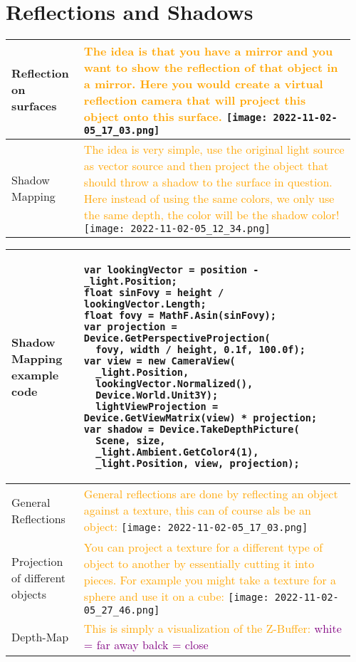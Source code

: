 \documentclass[main.tex,fontsize=8pt,paper=a4,paper=portrait,DIV=calc,]{scrartcl}
\begin{document}
\begin{table}[ht!]
\section{Reflections and Shadows}
\begin{tabular}{|m{0.2\linewidth}|m{0.755\linewidth}|}
\hline 
Reflection on surfaces & 
\textcolor{orange}{The idea is that you have a mirror and you want to show the reflection of that object in a mirror. Here you would create a virtual reflection camera that will project this object onto this surface.}\newline
\texttt{[image: 2022-11-02-05\_17\_03.png]}\\
\hline
Shadow Mapping & 
\textcolor{orange}{The idea is very simple, use the original light source as vector source and then project the object that should throw a shadow to the surface in question. \newline
Here instead of using the same colors, we only use the same depth, the color will be the shadow color!}\newline
\texttt{[image: 2022-11-02-05\_12\_34.png]}\\
\hline
\end{tabular}
\end{table}
\pagebreak
\begin{table}[ht!]
\begin{tabular}{|m{0.2\linewidth}|m{0.755\linewidth}|}
\hline 
Shadow Mapping example code &
\vspace{2mm}
\begin{lstlisting}
var lookingVector = position - _light.Position;
float sinFovy = height / lookingVector.Length;
float fovy = MathF.Asin(sinFovy);
var projection = Device.GetPerspectiveProjection(
  fovy, width / height, 0.1f, 100.0f);
var view = new CameraView(
  _light.Position,
  lookingVector.Normalized(),
  Device.World.Unit3Y);
  lightViewProjection = Device.GetViewMatrix(view) * projection;
var shadow = Device.TakeDepthPicture(
  Scene, size,
  _light.Ambient.GetColor4(1),
  _light.Position, view, projection);
\end{lstlisting}\\
\hline
General Reflections & 
\textcolor{orange}{General reflections are done by reflecting an object against a texture, this can of course als be an object:}\newline
\texttt{[image: 2022-11-02-05\_17\_03.png]}\\
\hline
Projection of different objects & 
\textcolor{orange}{You can project a texture for a different type of object to another by essentially cutting it into pieces. For example you might take a texture for a sphere and use it on a cube:}\newline
\texttt{[image: 2022-11-02-05\_27\_46.png]}\\
\hline
Depth-Map&
\textcolor{orange}{This is simply a visualization of the Z-Buffer:}\newline
\textcolor{purple}{white = far away\newline
balck = close}\\
\hline
\end{tabular}
\end{table}
\end{document}
